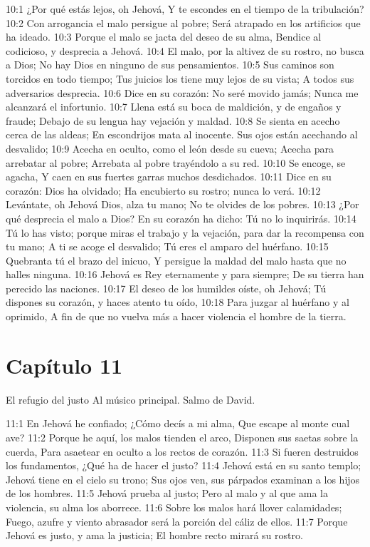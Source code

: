 10:1 ¿Por qué estás lejos, oh Jehová, 
Y te escondes en el tiempo de la tribulación? 
10:2 Con arrogancia el malo persigue al pobre; 
Será atrapado en los artificios que ha ideado. 
10:3 Porque el malo se jacta del deseo de su alma, 
Bendice al codicioso, y desprecia a Jehová. 
10:4 El malo, por la altivez de su rostro, no busca a Dios; 
No hay Dios en ninguno de sus pensamientos. 
10:5 Sus caminos son torcidos en todo tiempo; 
Tus juicios los tiene muy lejos de su vista; 
A todos sus adversarios desprecia. 
10:6 Dice en su corazón: No seré movido jamás; 
Nunca me alcanzará el infortunio. 
10:7 Llena está su boca de maldición, y de engaños y fraude; 
Debajo de su lengua hay vejación y maldad. 
10:8 Se sienta en acecho cerca de las aldeas; 
En escondrijos mata al inocente. 
Sus ojos están acechando al desvalido; 
10:9 Acecha en oculto, como el león desde su cueva; 
Acecha para arrebatar al pobre; 
Arrebata al pobre trayéndolo a su red. 
10:10 Se encoge, se agacha, 
Y caen en sus fuertes garras muchos desdichados. 
10:11 Dice en su corazón: Dios ha olvidado; 
Ha encubierto su rostro; nunca lo verá. 
10:12 Levántate, oh Jehová Dios, alza tu mano; 
No te olvides de los pobres. 
10:13 ¿Por qué desprecia el malo a Dios? 
En su corazón ha dicho: Tú no lo inquirirás. 
10:14 Tú lo has visto; porque miras el trabajo y la vejación, para dar la recompensa con tu mano; 
A ti se acoge el desvalido; 
Tú eres el amparo del huérfano. 
10:15 Quebranta tú el brazo del inicuo, 
Y persigue la maldad del malo hasta que no halles ninguna. 
10:16 Jehová es Rey eternamente y para siempre; 
De su tierra han perecido las naciones. 
10:17 El deseo de los humildes oíste, oh Jehová; 
Tú dispones su corazón, y haces atento tu oído, 
10:18 Para juzgar al huérfano y al oprimido, 
A fin de que no vuelva más a hacer violencia el hombre de la tierra. 
\section*{Capítulo 11}
El refugio del justo 
Al músico principal. Salmo de David. 

11:1 En Jehová he confiado; 
¿Cómo decís a mi alma, 
Que escape al monte cual ave? 
11:2 Porque he aquí, los malos tienden el arco, 
Disponen sus saetas sobre la cuerda, 
Para asaetear en oculto a los rectos de corazón. 
11:3 Si fueren destruidos los fundamentos, 
¿Qué ha de hacer el justo? 
11:4 Jehová está en su santo templo; 
Jehová tiene en el cielo su trono; 
Sus ojos ven, sus párpados examinan a los hijos de los hombres. 
11:5 Jehová prueba al justo; 
Pero al malo y al que ama la violencia, su alma los aborrece. 
11:6 Sobre los malos hará llover calamidades; 
Fuego, azufre y viento abrasador será la porción del cáliz de ellos. 
11:7 Porque Jehová es justo, y ama la justicia; 
El hombre recto mirará su rostro. 
